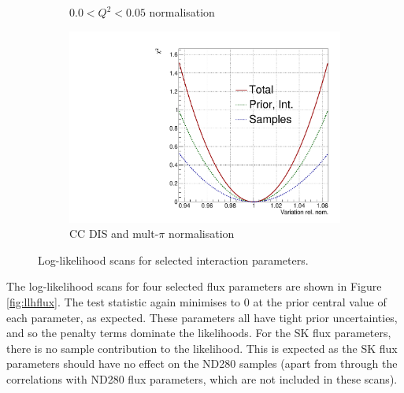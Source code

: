 \begin{figure}
\begin{subfigure}{.49\textwidth}
  \caption{$0.0 < Q^2 < 0.05$ normalisation}
\end{subfigure}
\begin{subfigure}{.49\textwidth}
  \centering
  \includegraphics[width=0.7\linewidth]{figs/llh/CC_DIS_MultPi_Norm_Nubar_llh.pdf}
  \caption{CC DIS and mult-$\pi$ normalisation}
\end{subfigure}
\caption{Log-likelihood scans for selected interaction parameters.}
\label{fig:llhxsec}
\end{figure}

The log-likelihood scans for four selected flux parameters are shown in Figure \ref{fig:llhflux}. The test statistic again minimises to 0 at the prior central value of each parameter, as expected. These parameters all have tight prior uncertainties, and so the penalty terms dominate the likelihoods. For the SK flux parameters, there is no sample contribution to the likelihood. This is expected as the SK flux parameters should have no effect on the ND280 samples (apart from through the correlations with ND280 flux parameters, which are not included in these scans). 


